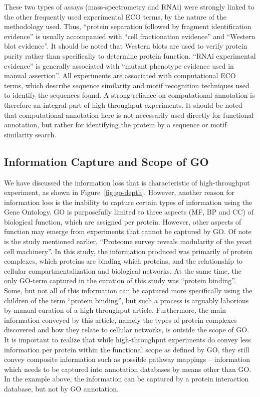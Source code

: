 \documentclass[12pt]{article}
\begin{document}
These two types of assays (mass-spectrometry and RNAi)  were strongly linked to the
other frequently used experimental ECO terms, by the nature of the methodology used.
Thus, ``protein separation followed by fragment identification evidence'' is usually
accompanied with ``cell fractionation evidence'' and ``Western blot evidence''. It
should be noted that Western blots are used to verify protein purity rather than
specifically to determine protein function. ``RNAi experimental evidence''
is generally associated with ``mutant phenotype evidence used in manual assertion''.
All experiments are associated with computational ECO terms, which describe sequence
similarity and motif recognition techniques used to identify the sequences found.
A strong reliance on computational annotation is therefore an integral part of high
throughput experiments. It should be noted that computational annotation here is not
necessarily used directly for functional annotation, but rather for identifying the
protein by a sequence or motif similarity search.

\subsection*{Information Capture and Scope of GO}

We have discussed the information loss that is characteristic of high-throughput
experiment, as shown in Figure~\ref{fig:go-depth}. However, another reason for information loss is the inability to
capture certain types of information using the Gene Ontology. GO is purposefully 
limited to three aspects (MF, BP and CC) of biological function, which are assigned
per protein.  However, other aspects of function may emerge from experiments that
cannot be captured by GO. Of note is the study mentioned earlier, ``Proteome survey
reveals modularity of the yeast cell machinery''\cite{pmid18029348}. In this study,
the information produced was primarily of protein complexes, which proteins are
binding which proteins, and the relationship to cellular compartmentalization and
biological networks. At the same time, the only GO-term captured in the curation of
this study was ``protein binding''.  Some, but not all of this information can be
captured more specifically using the children of the term ``protein binding'', but
such a process is arguably laborious by manual curation of a high throughput
article.  Furthermore, the main information conveyed by this article, namely the
types of protein complexes discovered and how they relate to cellular networks, is
outside the scope of GO. It is important to realize that while high-throughput
experiments do convey less information per protein within the functional scope as
defined by GO, they still convey composite information such as possible pathway
mappings -- information which needs to be captured into annotation databases by
means other than GO.  In the example above, the information can be captured by a
protein interaction database, but not by GO annotation.
\end{document}
